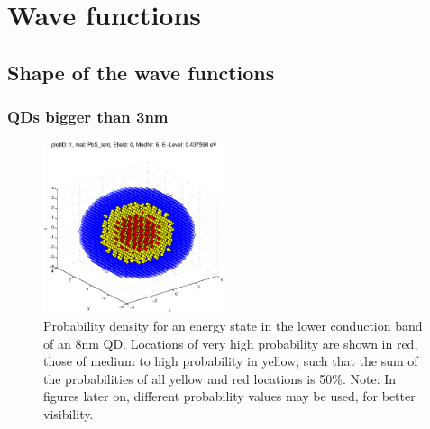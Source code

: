 \section{Wave functions}

\subsection{Shape of the wave functions}

\subsubsection{QDs bigger than 3nm} 

\begin{figure}[htbp]
	\centering
	\includegraphics[width=200px]{Fig/Plots/r4CBMod6}
	\caption{Probability density for an energy state in the lower conduction band of an 8nm QD. Locations of very high probability are shown in red, those of medium to high probability in yellow, such that the sum of the probabilities of all yellow and red locations is 50\%. Note: In figures later on, different probability values may be used, for better visibility.}
	\label{fig:sphericalWaveFn}
\end{figure}
%
